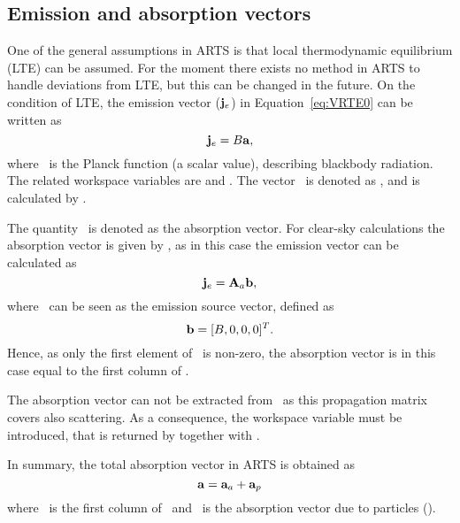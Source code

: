 \subsection{Emission and absorption vectors}
\label{sec:rteq:evec}

One of the general assumptions in ARTS is that local thermodynamic equilibrium
(LTE) can be assumed. For the moment there exists no method in ARTS to handle
deviations from LTE, but this can be changed in the future.
On the condition of LTE, the emission vector ($\mathbf{j}_e$) in
Equation~\ref{eq:VRTE0} can be written as
\begin{equation}
  \label{eq:evec1}
  {\bf j}_{e} = B {\bf a},
\end{equation}
where \Planck\ is the Planck function (a scalar value), describing blackbody
radiation. The related workspace variables are 
and . The vector \ is
denoted as , and is calculated by
.

The quantity \AbsVec\ is denoted as the absorption vector. For clear-sky
calculations the absorption vector is given by , as in this case the
emission vector can be calculated as
\begin{equation}
  \label{eq:evec2}
  {\bf j}_{e} = {\bf A}_{a}{\bf b},
\end{equation}
where \EmsVec\ can be seen as the emission source vector, defined as
\begin{equation}
  {\bf b} = [B,0,0,0]^T.
\end{equation}
Hence, as only the first element of \EmsVec\ is non-zero, the absorption
vector is in this case equal to the first column of .

The absorption vector can not be extracted from \ as this
propagation matrix covers also scattering. As a consequence, the workspace
variable  must be introduced, that is returned by
 together with .

In summary, the total absorption vector in ARTS is obtained as
\begin{equation}
  \label{eq:evec3}
  {\bf a} = {\bf a}_{a} + {\bf a}_{p}
\end{equation}
where \ is the first column of \, and \ is the
absorption vector due to particles ().




